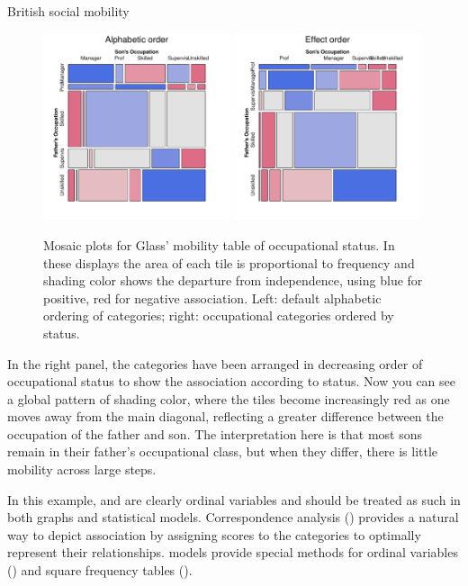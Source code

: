 \documentclass[11pt]{book}
\begin{document}
\begin{Example}[glass]{British social mobility}
\begin{figure}
  \centering
  \includegraphics[width=0.49\textwidth]{ch01/fig/glass-mosaic1}
  \hfill
  \includegraphics[width=0.49\textwidth]{ch01/fig/glass-mosaic2}
  \caption{Mosaic plots for Glass' mobility table of occupational status.
  In these displays the area of each tile is proportional to frequency
  and shading color shows the departure from independence, using
  blue for positive, red for negative association.
  Left: default alphabetic ordering of categories; right: occupational categories
  ordered by status.}
  \label{fig:glass-mosaic}
\end{figure}
In the right panel, the categories have been arranged in
decreasing order of occupational status to show the
association according to status.
Now you can see a global pattern of shading color, where the
tiles become increasingly red as one moves away from the main
diagonal, reflecting a greater difference between the occupation
of the father and son.  
The interpretation here is that most sons remain in their
father's occupational class, but when they differ,
there is little mobility across large steps.

In this example,  and  are clearly ordinal
variables and should be treated as such in both graphs and statistical models.
Correspondence analysis ()
provides a natural way to depict association by assigning scores to
the categories to optimally represent their relationships.
\Loglin models provide special methods
for ordinal variables ()
and square frequency tables ().

\end{Example}
\end{document}
